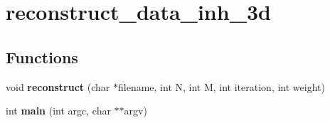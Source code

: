 \hypertarget{group__applications__mri2d__reconstruct__data__inh__3d}{
\section{reconstruct\_\-data\_\-inh\_\-3d}
\label{group__applications__mri2d__reconstruct__data__inh__3d}
}
\subsection*{Functions}
\begin{CompactItemize}
\item 
\hypertarget{group__applications__mri2d__reconstruct__data__inh__3d_ga0}{
void {\bf reconstruct} (char $\ast$filename, int N, int M, int iteration, int weight)}
\label{group__applications__mri2d__reconstruct__data__inh__3d_ga0}

\item 
\hypertarget{group__applications__mri2d__reconstruct__data__inh__3d_ga1}{
int {\bf main} (int argc, char $\ast$$\ast$argv)}
\label{group__applications__mri2d__reconstruct__data__inh__3d_ga1}

\end{CompactItemize}
